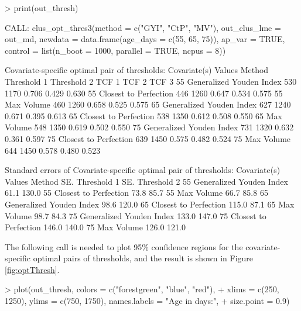 \begin{example}
> print(out_thresh)

CALL: clus_opt_thres3(method = c("GYI", "CtP", "MV"), out_clus_lme = out_md, 
    newdata = data.frame(age_days = c(55, 65, 75)), ap_var = TRUE, 
    control = list(n_boot = 1000, parallel = TRUE, ncpus = 8))
 
Covariate-specific optimal pair of thresholds: 
 Covariate(s) Values                   Method Threshold 1 Threshold 2 TCF 1 TCF 2 TCF 3
                  55 Generalized Youden Index         530        1170 0.706 0.429 0.630
                  55    Closest to Perfection         446        1260 0.647 0.534 0.575
                  55               Max Volume         460        1260 0.658 0.525 0.575
                  65 Generalized Youden Index         627        1240 0.671 0.395 0.613
                  65    Closest to Perfection         538        1350 0.612 0.508 0.550
                  65               Max Volume         548        1350 0.619 0.502 0.550
                  75 Generalized Youden Index         731        1320 0.632 0.361 0.597
                  75    Closest to Perfection         639        1450 0.575 0.482 0.524
                  75               Max Volume         644        1450 0.578 0.480 0.523

Standard errors of Covariate-specific optimal pair of thresholds: 
 Covariate(s) Values                   Method SE. Threshold 1 SE. Threshold 2
                  55 Generalized Youden Index            61.1           130.0
                  55    Closest to Perfection            73.8            85.7
                  55               Max Volume            66.7            85.8
                  65 Generalized Youden Index            98.6           120.0
                  65    Closest to Perfection           115.0            87.1
                  65               Max Volume            98.7            84.3
                  75 Generalized Youden Index           133.0           147.0
                  75    Closest to Perfection           146.0           140.0
                  75               Max Volume           126.0           121.0
\end{example}

\noindent
The following call is needed to plot 95\% confidence regions for the covariate-specific optimal pairs of thresholds, and the result is shown in Figure \ref{fig:optThresh}.

\begin{example}
> plot(out_thresh, colors = c("forestgreen", "blue", "red"),
+      xlims = c(250, 1250), ylims = c(750, 1750), names.labels = "Age in days:",
+      size.point = 0.9)
\end{example}

